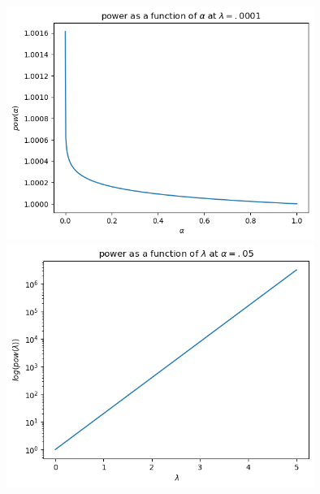 \documentclass[12pt,twoside]{article}
\begin{document}
\begin{enumerate}
\begin{itemize}
    \\\includegraphics[width=10cm]{homework/homework_6/immages/question_2_2.png}
    \\\includegraphics[width=10cm]{homework/homework_6/immages/question_2_3.png}
\end{itemize}
\newpage





\end{enumerate}
\end{document}
